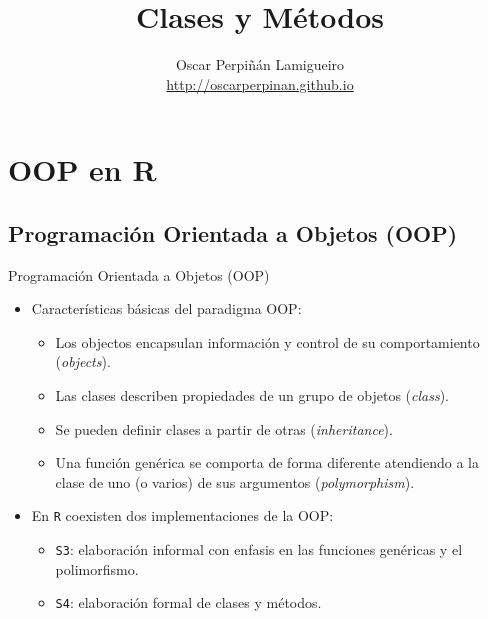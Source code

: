 \documentclass[xcolor={usenames,svgnames,dvipsnames}]{beamer}
\author{Oscar Perpiñán Lamigueiro \\ \url{http://oscarperpinan.github.io}}
\date{}
\title{Clases y Métodos}
\begin{document}
\maketitle

\section{OOP en R}
\label{sec:org00dee2c}
\subsection{Programación Orientada a Objetos (OOP)}
\label{sec:org8e3429f}

\begin{frame}[fragile,label={sec:org6af6f1b}]{Programación Orientada a Objetos (OOP)}
 \begin{itemize}
\item Características básicas del paradigma OOP:
\begin{itemize}
\item Los objectos encapsulan información y control de su comportamiento (\emph{objects}).
\item Las clases describen propiedades de un grupo de objetos (\emph{class}).
\item Se pueden definir clases a partir de otras (\emph{inheritance}).
\item Una función genérica se comporta de forma diferente atendiendo a la
clase de uno (o varios) de sus argumentos (\emph{polymorphism}).
\end{itemize}
\item En \texttt{R} coexisten dos implementaciones de la OOP:
\begin{itemize}
\item \texttt{S3}: elaboración informal con enfasis en las funciones genéricas y el polimorfismo.
\item \texttt{S4}: elaboración formal de clases y métodos.
\end{itemize}
\end{itemize}
\end{frame}
\end{document}
